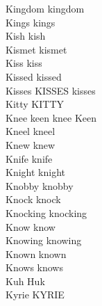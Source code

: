Kingdom kingdom\\
Kings kings\\
Kish kish\\
Kismet kismet\\
Kiss kiss\\
Kissed kissed\\
Kisses KISSES kisses\\
Kitty KITTY\\
Knee keen knee Keen\\
Kneel kneel\\
Knew knew\\
Knife knife\\
Knight knight\\
Knobby knobby\\
Knock knock\\
Knocking knocking\\
Know know\\
Knowing knowing\\
Known known\\
Knows knows\\
Kuh Huk\\
Kyrie KYRIE\\

